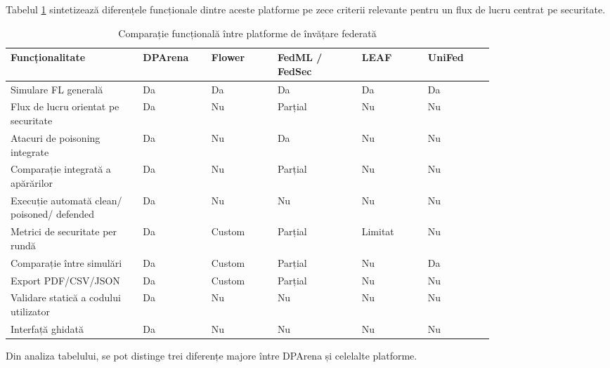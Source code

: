 \documentclass[../../main.tex]{subfiles}
\begin{document}
        Tabelul \ref{tab:feature_comparison_fl} sintetizează diferențele funcționale dintre aceste platforme pe zece criterii relevante pentru un flux de lucru centrat pe securitate.

        \begin{table}[h!]
            \centering
            \footnotesize
            \begin{tabular}{|p{0.22\linewidth}|p{0.11\linewidth}|p{0.11\linewidth}|p{0.14\linewidth}|p{0.11\linewidth}|p{0.11\linewidth}|}
                \hline
                \textbf{Funcționalitate} & \textbf{DPArena} & \textbf{Flower} & \textbf{FedML / FedSec} & \textbf{LEAF} & \textbf{UniFed} \\
                \hline
                Simulare FL generală & Da & Da & Da & Da & Da \\
                \hline
                Flux de lucru orientat pe securitate & Da & Nu & Parțial & Nu & Nu \\
                \hline
                Atacuri de poisoning integrate & Da & Nu & Da & Nu & Nu \\
                \hline
                Comparație integrată a apărărilor & Da & Nu & Parțial & Nu & Nu \\
                \hline
                Execuție automată clean/ poisoned/ defended & Da & Nu & Nu & Nu & Nu \\
                \hline
                Metrici de securitate per rundă & Da & Custom & Parțial & Limitat & Nu \\
                \hline
                Comparație între simulări & Da & Custom & Parțial & Nu & Da \\
                \hline
                Export PDF/CSV/JSON & Da & Custom & Parțial & Nu & Nu \\
                \hline
                Validare statică a codului utilizator & Da & Nu & Nu & Nu & Nu \\
                \hline
                Interfață ghidată & Da & Nu & Nu & Nu & Nu \\
                \hline
            \end{tabular}
            \caption{Comparație funcțională între platforme de învățare federată}
            \label{tab:feature_comparison_fl}
        \end{table}

        Din analiza tabelului, se pot distinge trei diferențe majore între DPArena și celelalte platforme.
\end{document}
